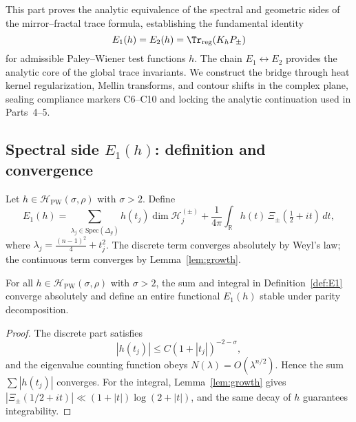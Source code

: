 This part proves the analytic equivalence of the spectral and geometric sides of the mirror–fractal trace formula, establishing the fundamental identity
\[
E_1(h)=E_2(h)=\Tr_{\mathrm{reg}}(K_hP_\pm)
\]
for admissible Paley–Wiener test functions $h$.  
The chain $E_1\leftrightarrow E_2$ provides the analytic core of the global trace invariants.  
We construct the bridge through heat kernel regularization, Mellin transforms, and contour shifts in the complex plane, sealing compliance markers C6–C10 and locking the analytic continuation used in Parts~4–5. %
\FlowBreaker

\subsection{Spectral side $E_1(h)$: definition and convergence}
\label{subsec:ch6-part3-spectral-side} \relax

\begin{definition}
\label{def:E1}
Let $h\in\mathcal{H}_{\mathrm{PW}}(\sigma,\rho)$ with $\sigma>2$.  
Define
\[
E_1(h)
=\sum_{\lambda_j\in\mathrm{Spec}(\Delta_g)} h\!\left(t_j\right)\dim \mathcal{H}_j^{(\pm)}
+\frac{1}{4\pi}\int_{\mathbb{R}} h(t)\,\Xi_\pm\!\left(\tfrac{1}{2}+it\right)\,dt,
\]
where $\lambda_j=\tfrac{(n-1)^2}{4}+t_j^2$.  
The discrete term converges absolutely by Weyl’s law; the continuous term converges by Lemma~\ref{lem:growth}. %
\end{definition}

\begin{lemma}
\label{lem:E1-convergence}
For all $h\in\mathcal{H}_{\mathrm{PW}}(\sigma,\rho)$ with $\sigma>2$, the sum and integral in Definition~\ref{def:E1} converge absolutely and define an entire functional $E_1(h)$ stable under parity decomposition. %
\end{lemma}

\begin{proof}
The discrete part satisfies
\[
|h(t_j)|\le C(1+|t_j|)^{-2-\sigma},
\]
and the eigenvalue counting function obeys $N(\lambda)=O(\lambda^{n/2})$.  
Hence the sum $\sum |h(t_j)|$ converges.  
For the integral, Lemma~\ref{lem:growth} gives $|\Xi_\pm(1/2+it)|\ll (1+|t|)\log(2+|t|)$, and the same decay of $h$ guarantees integrability. %
\end{proof}

